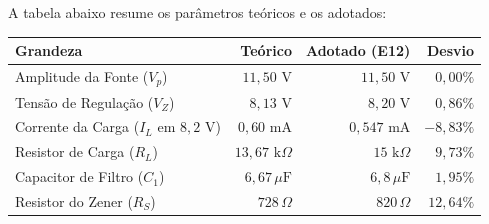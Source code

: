 \documentclass[11pt,a4paper]{article}
\begin{document}
A tabela abaixo resume os parâmetros teóricos e os adotados:

\begin{center}
\renewcommand{\arraystretch}{1.2}
\begin{tabular}{@{}lrrr@{}}
\toprule
\textbf{Grandeza} & \textbf{Teórico} & \textbf{Adotado (E12)} & \textbf{Desvio} \\
\midrule
Amplitude da Fonte ($V_p$) & $11{,}50\text{ V}$ & $11{,}50\text{ V}$ & $0{,}00\%$ \\
Tensão de Regulação ($V_Z$) & $8{,}13\text{ V}$ & $8{,}20\text{ V}$ & $0{,}86\%$ \\
Corrente da Carga ($I_L$ em $8{,}2\text{ V}$) & $0{,}60\text{ mA}$ & $0{,}547\text{ mA}$ & $-8{,}83\%$ \\
Resistor de Carga ($R_L$) & $13{,}67\text{ k}\Omega$ & $15\text{ k}\Omega$ & $9{,}73\%$ \\
Capacitor de Filtro ($C_1$) & $6{,}67\,\mu\text{F}$ & $6{,}8\,\mu\text{F}$ & $1{,}95\%$ \\
Resistor do Zener ($R_S$) & $728\,\Omega$ & $820\,\Omega$ & $12{,}64\%$ \\
\bottomrule
\end{tabular}
\end{center}






\end{document}
